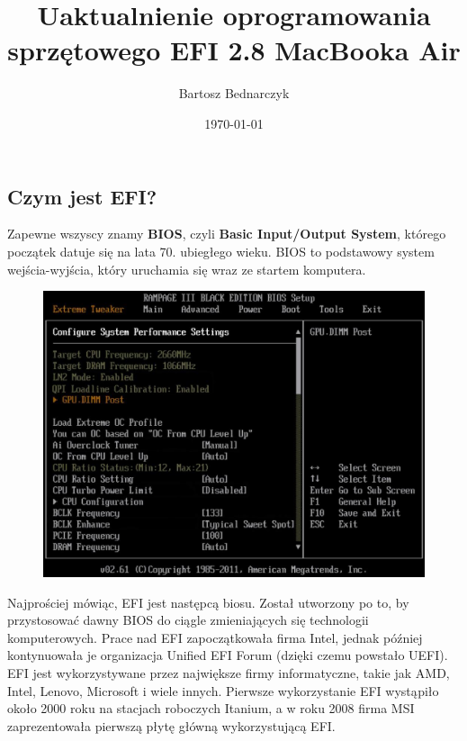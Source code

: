 \documentclass{article}
\begin{document}
\title{Uaktualnienie oprogramowania sprzętowego EFI 2.8 MacBooka Air}
\date{\today}
\author{Bartosz Bednarczyk}

\maketitle

\subsection*{Czym jest EFI?}

Zapewne wszyscy znamy \textbf{BIOS}, czyli \textbf{Basic Input/Output System}, którego początek datuje się na lata 70. ubiegłego wieku. BIOS to podstawowy system wejścia-wyjścia, który uruchamia się wraz ze startem komputera. 

\begin{figure}[h!]
\centering
\includegraphics[scale=0.4]{BIOS}	
\end{figure}

Najprościej mówiąc, EFI jest następcą biosu. Został utworzony po to, by przystosować dawny BIOS do ciągle zmieniających się technologii komputerowych. Prace nad EFI zapoczątkowała firma Intel, jednak później kontynuowała je organizacja Unified EFI Forum (dzięki czemu powstało UEFI). EFI jest wykorzystywane przez największe firmy informatyczne, takie jak AMD, Intel, Lenovo, Microsoft i wiele innych. Pierwsze wykorzystanie EFI wystąpiło około 2000 roku na stacjach roboczych Itanium, a w roku 2008 firma MSI zaprezentowała pierwszą płytę główną wykorzystującą EFI. 
\end{document}
